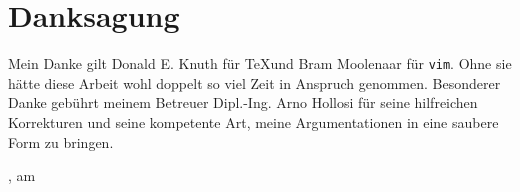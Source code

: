 
\chapter*{Danksagung}

Mein Danke gilt Donald E. Knuth für \TeX und Bram Moolenaar für \texttt{vim}. Ohne sie hätte diese Arbeit wohl doppelt so viel Zeit in Anspruch genommen.
Besonderer Danke gebührt meinem Betreuer Dipl.-Ing. Arno Hollosi für seine hilfreichen Korrekturen und seine kompetente Art, meine Argumentationen in eine
saubere Form zu bringen.

\vspace{1.5cm}

\begin{center}
\raggedleft{\campusAuthor}
\end{center}

\vspace{1.5cm}

\campusCity, am \campusDate
